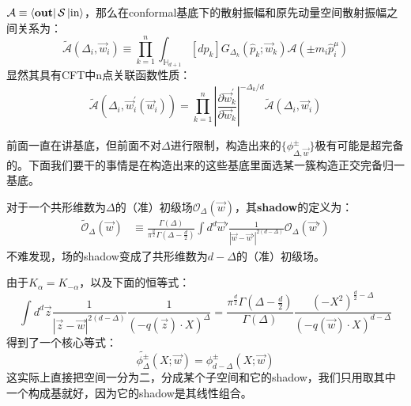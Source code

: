 $\mathcal{A}\equiv\bra{\textbf{out}}\mathcal{S}\ket{\text{in}}$，那么在conformal基底下的散射振幅和原先动量空间散射振幅之间关系为：
\begin{equation}
	\widetilde{\mathcal{A}}(\Delta_i,\vec{w}_i)\equiv\prod_{k=1}^n\int_{\mathbb{H}_{d+1}}[d\hat{p}_k]G_{\Delta_k}(\hat{p}_k;\vec{w}_k)\mathcal{A}(\pm m_i\hat{p}_i^\mu)
\end{equation}
显然其具有CFT中n点关联函数性质：
\begin{equation}
	\widetilde{\mathcal A}(\Delta_{i},\vec{w}_{i}^{\prime}(\vec{w}_{i}))=\prod_{k=1}^{n}\left|\frac{\partial\vec{w}_{k}^{\prime}}{\partial\vec{w}_{k}}\right|^{-\Delta_{k}/d}\widetilde{\mathcal A}(\Delta_{i},\vec{w}_{i})
\end{equation}

前面一直在讲基底，但前面不对$\Delta$进行限制，构造出来的$\{\phi^{\pm}_{\Delta,\vec{w}}\}$极有可能是超完备的。下面我们要干的事情是在构造出来的这些基底里面选某一簇构造正交完备归一基底。

\begin{definition}
	对于一个共形维数为$\Delta$的（准）初级场$\mathcal{O}_\Delta(\vec{w})$，其\textbf{shadow}的定义为\cite{Ferrara:1972xe,Ferrara:1972ay,Ferrara:1972uq,Ferrara:1972kab}：
	\begin{equation}
		\begin{aligned}\widetilde{\mathcal{O}}_\Delta(\vec{w})&\equiv\frac{\Gamma(\Delta)}{\pi^{\frac{d}{2}}\Gamma(\Delta-\frac{d}{2})}\int d^d\vec{w}'\frac{1}{|\vec{w}-\vec{w}'|^{2(d-\Delta)}}\mathcal{O}_\Delta(\vec{w}')\end{aligned}
	\end{equation}
	不难发现，场的shadow变成了共形维数为$d-\Delta$的（准）初级场。
\end{definition}
由于$K_\alpha=K_{-\alpha}$，以及下面的恒等式\cite{Simmons-Duffin:2012juh}：
\begin{equation}
	\int d^{d}\vec{z}\frac{1}{|\vec{z}-\vec{w}|^{2(d-\Delta)}}\frac{1}{(-q(\vec{z})\cdot X)^{\Delta}}=\frac{\pi^{\frac{d}{2}}\Gamma(\Delta-\frac{d}{2})}{\Gamma(\Delta)}\frac{(-X^{2})^{\frac{d}{2}-\Delta}}{(-q(\vec{w})\cdot X)^{d-\Delta}}
\end{equation}
得到了一个核心等式：
\begin{equation}\label{eq:27.17}
	\boxed{\widetilde{\phi_\Delta^\pm}(X;\vec{w})=\phi_{d-\Delta}^\pm(X;\vec{w})}
\end{equation}
这实际上直接把空间一分为二，分成某个子空间和它的shadow，我们只用取其中一个构成基就好，因为它的shadow是其线性组合。

